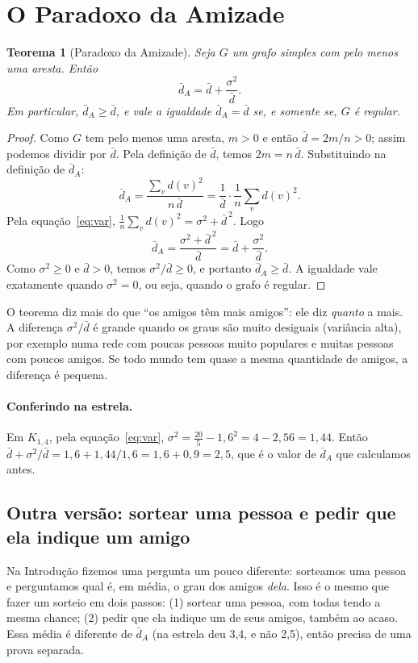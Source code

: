 \documentclass[12pt,a4paper]{article}
\theoremstyle{plain}
\newtheorem{teorema}{Teorema}
\theoremstyle{definition}
\theoremstyle{remark}
\newcommand{\dm}{\bar d}          %
\newcommand{\dA}{\bar d_{A}}      %
\begin{document}
\section{O Paradoxo da Amizade}\label{sec:paradoxo}

\begin{teorema}[Paradoxo da Amizade]\label{teo:principal}
Seja $G$ um grafo simples com pelo menos uma aresta. Então
\[
\dA = \dm + \frac{\sigma^2}{\dm}.
\]
Em particular, $\dA \ge \dm$, e vale a igualdade $\dA = \dm$ se, e
somente se, $G$ é regular.
\end{teorema}

\begin{proof}
Como $G$ tem pelo menos uma aresta, $m>0$ e então $\dm = 2m/n > 0$;
assim podemos dividir por $\dm$. Pela definição de $\dm$, temos
$2m = n\,\dm$. Substituindo na definição de $\dA$:
\[
\dA = \frac{\sum_v d(v)^2}{n\,\dm}
    = \frac{1}{\dm}\cdot\frac{1}{n}\sum_v d(v)^2 .
\]
Pela equação~\eqref{eq:var}, $\frac{1}{n}\sum_v d(v)^2 = \sigma^2 + \dm^{\,2}$. Logo
\[
\dA = \frac{\sigma^2 + \dm^{\,2}}{\dm} = \dm + \frac{\sigma^2}{\dm}.
\]
Como $\sigma^2 \ge 0$ e $\dm>0$, temos $\sigma^2/\dm \ge 0$, e portanto
$\dA \ge \dm$. A igualdade vale exatamente quando $\sigma^2 = 0$, ou
seja, quando o grafo é regular.
\end{proof}

O teorema diz mais do que “os amigos têm mais amigos”: ele diz
\emph{quanto} a mais. A diferença $\sigma^2/\dm$ é grande quando os
graus são muito desiguais (variância alta), por exemplo numa rede com
poucas pessoas muito populares e muitas pessoas com poucos amigos. Se
todo mundo tem quase a mesma quantidade de amigos, a diferença é
pequena.

\paragraph{Conferindo na estrela.} Em $K_{1,4}$, pela
equação~\eqref{eq:var}, $\sigma^2 = \frac{20}{5} - 1{,}6^2 = 4 - 2{,}56 = 1{,}44$.
Então $\dm + \sigma^2/\dm = 1{,}6 + 1{,}44/1{,}6 = 1{,}6 + 0{,}9 = 2{,}5$,
que é o valor de $\dA$ que calculamos antes.

\subsection{Outra versão: sortear uma pessoa e pedir que ela indique um amigo}

Na Introdução fizemos uma pergunta um pouco diferente: sorteamos uma
pessoa e perguntamos qual é, em média, o grau dos amigos \emph{dela}.
Isso é o mesmo que fazer um sorteio em dois passos: (1) sortear uma
pessoa, com todas tendo a mesma chance; (2) pedir que ela indique um de
seus amigos, também ao acaso. Essa média é diferente de $\dA$ (na
estrela deu 3,4, e não 2,5), então precisa de uma prova separada.
\end{document}
